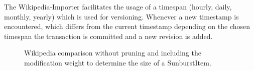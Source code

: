 The Wikipedia-Importer facilitates the usage of a timespan (hourly, daily, monthly, yearly) which is used for versioning. Whenever a new timestamp is encountered, which differs from the current timestamp depending on the chosen timespan the transaction is committed and a new revision is added.

\begin{figure}[tb]
\caption{\label{fig:wikivis-without-modscale} Wikipedia comparison without pruning and including the modification weight to determine the size of a SunburstItem.}
\end{figure}

